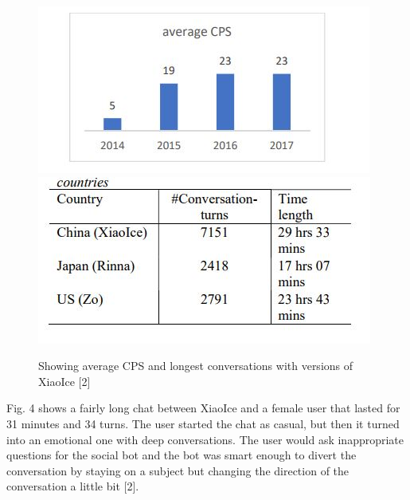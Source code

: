 \documentclass[letterpaper, 10 pt, conference]{IEEEtran}
\begin{document}
\begin{figure}[!ht]
\renewcommand\figurename{Fig.}
\centering
\includegraphics[width=\columnwidth]{averageCPS.png}
\includegraphics[width=\columnwidth]{Biggestconversations.png}
\caption{Showing average CPS and longest conversations with versions of XiaoIce [2]}
\end{figure} 

\par Fig. 4 shows a fairly long chat between XiaoIce and a female user that lasted for 31 minutes and 34 turns. The user started the chat as casual, but then it turned into an emotional one with deep conversations. The user would ask inappropriate questions for the social bot and the bot was smart enough to divert the conversation by staying on a subject but changing the direction of the conversation a little bit [2].
\end{document}
